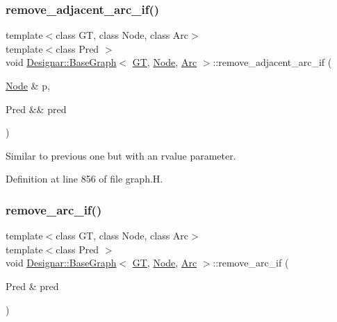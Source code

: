 \subsubsection{\texorpdfstring{remove\+\_\+adjacent\+\_\+arc\+\_\+if()}{remove\_adjacent\_arc\_if()}\hspace{0.1cm}{\footnotesize\ttfamily [2/2]}}
{\footnotesize\ttfamily template$<$class GT, class Node, class Arc$>$ \\
template$<$class Pred $>$ \\
void \hyperlink{class_designar_1_1_base_graph}{Designar\+::\+Base\+Graph}$<$ \hyperlink{demo-buildgraph_8_c_a3001c40d2c31ca87ed96cd7d1334a55e}{GT}, \hyperlink{namespace_designar_a5af326c65aa2bd26b26c410f2030d09e}{Node}, \hyperlink{namespace_designar_a3f55fb5513d62ff47cbc8f72b8e95d6f}{Arc} $>$\+::remove\+\_\+adjacent\+\_\+arc\+\_\+if (\begin{DoxyParamCaption}\item[{\hyperlink{namespace_designar_a5af326c65aa2bd26b26c410f2030d09e}{Node} \&}]{p,  }\item[{Pred \&\&}]{pred }\end{DoxyParamCaption})\hspace{0.3cm}{\ttfamily [inline]}}



Similar to previous one but with an rvalue parameter. 



Definition at line 856 of file graph.\+H.

\mbox{\label{class_designar_1_1_base_graph_a9c97f2759a2847e61e17dc2806172758}} 
\subsubsection{\texorpdfstring{remove\+\_\+arc\+\_\+if()}{remove\_arc\_if()}\hspace{0.1cm}{\footnotesize\ttfamily [1/2]}}
{\footnotesize\ttfamily template$<$class GT, class Node, class Arc$>$ \\
template$<$class Pred $>$ \\
void \hyperlink{class_designar_1_1_base_graph}{Designar\+::\+Base\+Graph}$<$ \hyperlink{demo-buildgraph_8_c_a3001c40d2c31ca87ed96cd7d1334a55e}{GT}, \hyperlink{namespace_designar_a5af326c65aa2bd26b26c410f2030d09e}{Node}, \hyperlink{namespace_designar_a3f55fb5513d62ff47cbc8f72b8e95d6f}{Arc} $>$\+::remove\+\_\+arc\+\_\+if (\begin{DoxyParamCaption}\item[{Pred \&}]{pred }\end{DoxyParamCaption})\hspace{0.3cm}{\ttfamily [inline]}}



